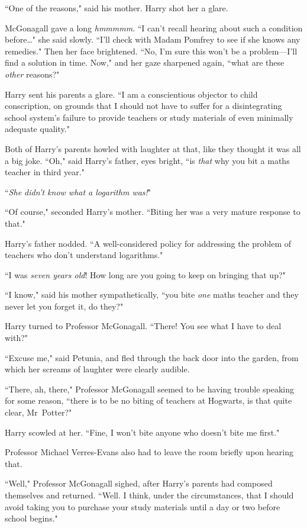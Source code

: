 ``One of the reasons," said his mother. Harry shot her a glare.

McGonagall gave a long \emph{hmmmmm}. ``I can't recall hearing about such a condition before…" she said slowly. ``I'll check with Madam Pomfrey to see if she knows any remedies." Then her face brightened. ``No, I'm sure this won't be a problem—I'll find a solution in time. Now," and her gaze sharpened again, ``what are these \emph{other} reasons?"

Harry sent his parents a glare. ``I am a conscientious objector to child conscription, on grounds that I should not have to suffer for a disintegrating school system's failure to provide teachers or study materials of even minimally adequate quality."

Both of Harry's parents howled with laughter at that, like they thought it was all a big joke. ``Oh," said Harry's father, eyes bright, ``is \emph{that} why you bit a maths teacher in third year."

``\emph{She didn't know what a logarithm was!}"

``Of course," seconded Harry's mother. ``Biting her was a very mature response to that."

Harry's father nodded. ``A well-considered policy for addressing the problem of teachers who don't understand logarithms."

``I was \emph{seven years old}! How long are you going to keep on bringing that up?"

``I know," said his mother sympathetically, ``you bite \emph{one} maths teacher and they never let you forget it, do they?"

Harry turned to Professor McGonagall. ``There! You see what I have to deal with?"

``Excuse me," said Petunia, and fled through the back door into the garden, from which her screams of laughter were clearly audible.

``There, ah, there," Professor McGonagall seemed to be having trouble speaking for some reason, ``there is to be no biting of teachers at Hogwarts, is that quite clear, Mr~Potter?"

Harry scowled at her. ``Fine, I won't bite anyone who doesn't bite me first."

Professor Michael Verres-Evans also had to leave the room briefly upon hearing that.

``Well," Professor McGonagall sighed, after Harry's parents had composed themselves and returned. ``Well. I think, under the circumstances, that I should avoid taking you to purchase your study materials until a day or two before school begins."

